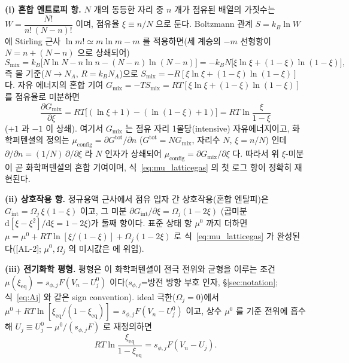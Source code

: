 \documentclass[11pt,a4paper]{article}
\newcommand{\dd}{\mathrm{d}}
\newcommand{\eq}{\mathrm{eq}}
\newcommand{\AL}[1]{\textsf{[AL-#1]}}
\begin{document}
\textbf{(i) 혼합 엔트로피 항.} $N$ 개의 동등한 자리 중 $n$ 개가 점유된 배열의 가짓수는
$W=\dfrac{N!}{n!\,(N-n)!}$ 이며, 점유율 $\xi\equiv n/N$ 으로 둔다. Boltzmann 관계 $S=k_B\ln W$ 에 Stirling
근사 $\ln m!\simeq m\ln m-m$ 를 적용하면(세 계승의 $-m$ 선형항이 $N=n+(N-n)$ 으로 상쇄되어)
\begin{equation}
S_{\mathrm{mix}}=k_B\big[N\ln N-n\ln n-(N-n)\ln(N-n)\big]
=-k_B N\big[\xi\ln\xi+(1-\xi)\ln(1-\xi)\big],
\label{eq:smix}
\end{equation}
즉 몰 기준($N\!\to\!N_A$, $R=k_B N_A$)으로 $S_{\mathrm{mix}}=-R[\xi\ln\xi+(1-\xi)\ln(1-\xi)]$ 다. 자유
에너지의 혼합 기여 $G_{\mathrm{mix}}=-TS_{\mathrm{mix}}=RT[\xi\ln\xi+(1-\xi)\ln(1-\xi)]$ 를 점유율로 미분하면
\begin{equation}
\frac{\partial G_{\mathrm{mix}}}{\partial\xi}=RT\big[(\ln\xi+1)-(\ln(1-\xi)+1)\big]=RT\ln\frac{\xi}{1-\xi}
\label{eq:mu_mix}
\end{equation}
($+1$ 과 $-1$ 이 상쇄). 여기서 $G_{\mathrm{mix}}$ 는 점유 자리 1몰당(intensive) 자유에너지이고, 화학퍼텐셜의 정의는
$\mu_{\mathrm{config}}=\partial G^{\mathrm{tot}}/\partial n$ ($G^{\mathrm{tot}}=N G_{\mathrm{mix}}$, 자리수 $N$, $\xi=n/N$)
인데 $\partial/\partial n=(1/N)\,\partial/\partial\xi$ 라 $N$ 인자가 상쇄되어 $\mu_{\mathrm{config}}=\partial G_{\mathrm{mix}}/\partial\xi$
다. 따라서 위 $\xi$-미분이 곧 화학퍼텐셜의 혼합 기여이며, 식~\eqref{eq:mu_latticegas} 의 첫 로그 항이 정확히 재현된다.

\textbf{(ii) 상호작용 항.} 정규용액 근사에서 점유 입자 간 상호작용(혼합 엔탈피)은
$G_{\mathrm{int}}=\Omega_j\,\xi(1-\xi)$ 이고, 그 미분 $\partial G_{\mathrm{int}}/\partial\xi
=\Omega_j(1-2\xi)$ (곱미분 $\dd[\xi-\xi^2]/\dd\xi=1-2\xi$)가 둘째 항이다. 표준 상태 항 $\mu^0$ 까지 더하면
$\mu=\mu^0+RT\ln[\xi/(1-\xi)]+\Omega_j(1-2\xi)$ 로 식~\eqref{eq:mu_latticegas} 가 완성된다(\AL{2};
$\mu^0,\Omega_j$ 의 미시값은 \cite{mckinnon1983,bazant2013} 에 위임).

\textbf{(iii) 전기화학 평형.} 평형은 이 화학퍼텐셜이 전극 전위와 균형을 이루는 조건
$\mu(\xi_\eq)=s_{\phi,j}F(V_n-U_j^0)$ 이다($s_{\phi,j}$=방전 방향 부호 인자, \S\ref{sec:notation};
식~\eqref{eq:Aj} 와 같은 sign convention). ideal 극한($\Omega_j=0$)에서 $\mu^0+RT\ln[\xi_\eq/(1-\xi_\eq)]
=s_{\phi,j}F(V_n-U_j^0)$ 이고, 상수 $\mu^0$ 를 기준 전위에 흡수해 $U_j\equiv U_j^0-\mu^0/(s_{\phi,j}F)$ 로
재정의하면
\begin{equation}
RT\ln\frac{\xi_\eq}{1-\xi_\eq}=s_{\phi,j}F(V_n-U_j).
\label{eq:eqbal_ideal}
\end{equation}
\end{document}
